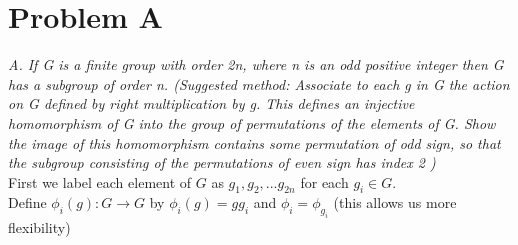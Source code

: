 \documentclass{article}
\begin{document}
    \section{Problem A}
    \emph{
        A. If G is a finite group with order 2n, where n is an odd positive integer then G has a subgroup of order n.
        (Suggested method: Associate to each g in G the action on G defined by right multiplication by g. This defines
        an injective homomorphism of G into the group of permutations of the elements of G.  Show the image of this
        homomorphism contains some permutation  of odd sign, so that the subgroup consisting of the permutations of even sign 
        has index 2 )
    }\\
    First we label each element of $G$ as  $g_1,g_2,...g_{2n}$ for each $g_i \in G$.\\
    Define $\phi_i(g): G \rightarrow G$ by $\phi_i(g) = gg_i$ and $\phi_i = \phi_{g_i}$ (this allows us more flexibility)
\end{document}
